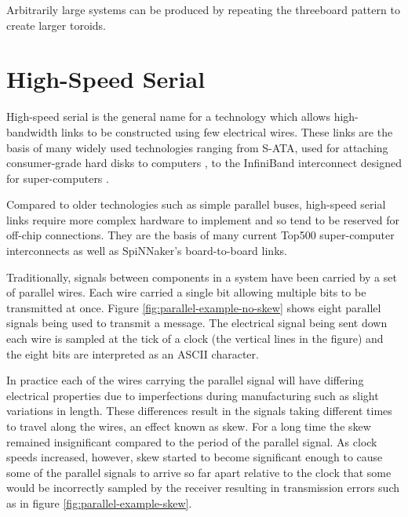 			Arbitrarily large systems can be produced by repeating the threeboard
			pattern to create larger toroids.
	
	\section{High-Speed Serial}
		
		\label{sec:high-speed-serial}
		
		
		High-speed serial is the general name for a technology which allows
		high-bandwidth links to be constructed using few electrical wires.
		These links are the basis of many widely used technologies ranging from
		S-ATA, used for attaching consumer-grade hard disks to computers
		\cite{sataio}, to the InfiniBand interconnect designed for super-computers
		\cite{infinibandta}.
		
		Compared to older technologies such as simple parallel buses, high-speed
		serial links require more complex hardware to implement and so tend to be
		reserved for off-chip connections. They are the basis of many current Top500
		super-computer interconnects as well as SpiNNaker's board-to-board links.
		
		Traditionally, signals between components in a system have been carried by a
		set of parallel wires. Each wire carried a single bit allowing multiple bits
		to be transmitted at once. Figure \ref{fig:parallel-example-no-skew} shows
		eight parallel signals being used to transmit a message. The electrical
		signal being sent down each wire is sampled at the tick of a clock (the
		vertical lines in the figure) and the eight bits are interpreted as an ASCII
		character.
		
		In practice each of the wires carrying the parallel signal will have
		differing electrical properties due to imperfections during manufacturing
		such as slight variations in length. These differences result in the
		signals taking different times to travel along the wires, an effect known
		as skew. For a long time the skew remained insignificant compared to the
		period of the parallel signal.  As clock speeds increased, however, skew
		started to become significant enough to cause some of the parallel signals
		to arrive so far apart relative to the clock that some would be
		incorrectly sampled by the receiver resulting in transmission errors such
		as in figure \ref{fig:parallel-example-skew}.
		

